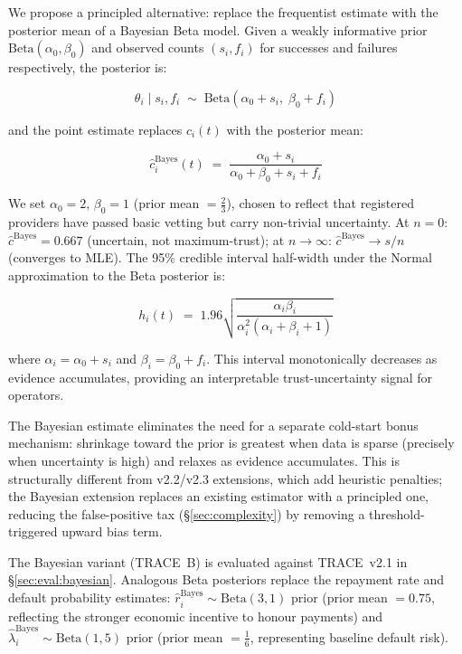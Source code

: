 \documentclass[sigconf,nonacm,10pt]{acmart}
\begin{document}
We propose a principled alternative: replace the frequentist estimate with the
posterior mean of a Bayesian Beta model. Given a weakly informative prior
$\text{Beta}(\alpha_0, \beta_0)$ and observed counts $(s_i, f_i)$ for
successes and failures respectively, the posterior is:

\begin{equation}
  \theta_i \mid s_i, f_i \;\sim\;
  \text{Beta}(\alpha_0 + s_i,\; \beta_0 + f_i)
  \label{eq:bayesian_posterior}
\end{equation}

and the point estimate replaces $c_i(t)$ with the posterior mean:

\begin{equation}
  \hat{c}_i^{\text{Bayes}}(t) \;=\;
    \frac{\alpha_0 + s_i}{\alpha_0 + \beta_0 + s_i + f_i}
  \label{eq:bayesian_completion}
\end{equation}

We set $\alpha_0 = 2$, $\beta_0 = 1$ (prior mean $= \tfrac{2}{3}$), chosen
to reflect that registered providers have passed basic vetting but carry
non-trivial uncertainty. At $n = 0$: $\hat{c}^{\text{Bayes}} = 0.667$
(uncertain, not maximum-trust); at $n \to \infty$: $\hat{c}^{\text{Bayes}}
\to s/n$ (converges to MLE). The 95\% credible interval half-width under the
Normal approximation to the Beta posterior is:

\begin{equation}
  h_i(t) \;=\; 1.96\sqrt{
    \frac{\alpha_i \beta_i}{\alpha_i^2 (\alpha_i + \beta_i + 1)}
  }
  \label{eq:bayesian_ci}
\end{equation}

where $\alpha_i = \alpha_0 + s_i$ and $\beta_i = \beta_0 + f_i$. This
interval monotonically decreases as evidence accumulates, providing an
interpretable trust-uncertainty signal for operators.

The Bayesian estimate eliminates the need for a separate cold-start bonus
mechanism: shrinkage toward the prior is greatest when data is sparse
(precisely when uncertainty is high) and relaxes as evidence accumulates.
This is structurally different from v2.2/v2.3 extensions, which add
heuristic penalties; the Bayesian extension replaces an existing estimator
with a principled one, reducing the false-positive tax
(\S\ref{sec:complexity}) by removing a threshold-triggered
upward bias term.

The Bayesian variant (TRACE~B) is evaluated against TRACE~v2.1 in
\S\ref{sec:eval:bayesian}. Analogous Beta posteriors replace the
repayment rate and default probability estimates:
$\hat{r}_i^{\text{Bayes}} \sim \text{Beta}(3, 1)$ prior (prior mean
$= 0.75$, reflecting the stronger economic incentive to honour payments)
and $\hat{\lambda}_i^{\text{Bayes}} \sim \text{Beta}(1, 5)$ prior
(prior mean $= \tfrac{1}{6}$, representing baseline default risk).
\end{document}
